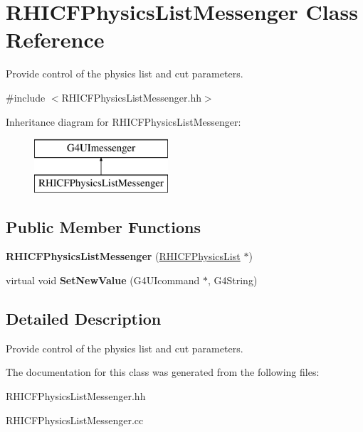 \hypertarget{class_r_h_i_c_f_physics_list_messenger}{}\section{R\+H\+I\+C\+F\+Physics\+List\+Messenger Class Reference}
\label{class_r_h_i_c_f_physics_list_messenger}


Provide control of the physics list and cut parameters.  




{\ttfamily \#include $<$R\+H\+I\+C\+F\+Physics\+List\+Messenger.\+hh$>$}

Inheritance diagram for R\+H\+I\+C\+F\+Physics\+List\+Messenger\+:\begin{figure}[H]
\begin{center}
\leavevmode
\includegraphics[height=2.000000cm]{class_r_h_i_c_f_physics_list_messenger}
\end{center}
\end{figure}
\subsection*{Public Member Functions}
\begin{DoxyCompactItemize}
\item 
\hypertarget{class_r_h_i_c_f_physics_list_messenger_ad5e2d9fc22274c779ac1dac28bd5eece}{}{\bfseries R\+H\+I\+C\+F\+Physics\+List\+Messenger} (\hyperlink{class_r_h_i_c_f_physics_list}{R\+H\+I\+C\+F\+Physics\+List} $\ast$)\label{class_r_h_i_c_f_physics_list_messenger_ad5e2d9fc22274c779ac1dac28bd5eece}

\item 
\hypertarget{class_r_h_i_c_f_physics_list_messenger_ac4d12b8f3f3b71ff30ee36e2bacf369c}{}virtual void {\bfseries Set\+New\+Value} (G4\+U\+Icommand $\ast$, G4\+String)\label{class_r_h_i_c_f_physics_list_messenger_ac4d12b8f3f3b71ff30ee36e2bacf369c}

\end{DoxyCompactItemize}


\subsection{Detailed Description}
Provide control of the physics list and cut parameters. 

The documentation for this class was generated from the following files\+:\begin{DoxyCompactItemize}
\item 
R\+H\+I\+C\+F\+Physics\+List\+Messenger.\+hh\item 
R\+H\+I\+C\+F\+Physics\+List\+Messenger.\+cc\end{DoxyCompactItemize}
